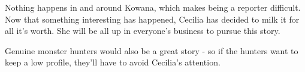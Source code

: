 \documentclass{motw}
\begin{document}

Nothing happens in and around Kowana, which makes being a reporter difficult. Now that something interesting has happened, Cecilia has decided to milk it for all it’s worth. She will be all up in everyone’s business to pursue this story.

Genuine monster hunters would also be a great story - so if the hunters want to keep a low profile, they’ll have to avoid Cecilia’s attention.

\makeImageCredits[cc-by-nc-sa]
\end{document}

